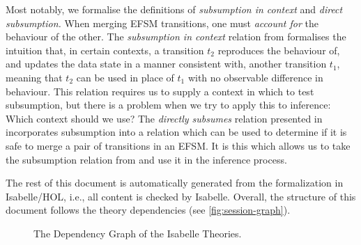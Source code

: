 \documentclass[10pt,DIV16,a4paper,abstract=true,twoside=semi,openright]{scrreprt}
\begin{document}
Most notably, we formalise the definitions of \emph{subsumption in context} and \emph{direct subsumption.} When merging EFSM transitions, one must \emph{account for} the behaviour of the other. The \emph{subsumption in context} relation from \cite{foster2018} formalises the intuition that, in certain contexts, a transition $t_2$ reproduces the behaviour of, and updates the data state in a manner consistent with, another transition $t_1$, meaning that $t_2$ can be used in place of $t_1$ with no observable difference in behaviour. This relation requires us to supply a context in which to test subsumption, but there is a problem when we try to apply this to inference: Which context should we use? The \emph{directly subsumes} relation presented in \cite{foster2019} incorporates subsumption into a relation which can be used to determine if it is safe to merge a pair of transitions in an EFSM. It is this which allows us to take the subsumption relation from \cite{foster2018} and use it in the inference process.

The rest of this document is automatically generated from the formalization in Isabelle/HOL, i.e., all content is checked by Isabelle.  Overall, the structure of this document follows the theory dependencies (see \autoref{fig:session-graph}).

\begin{sidewaysfigure}
  \centering
  \caption{The Dependency Graph of the Isabelle Theories.\label{fig:session-graph}}
\end{sidewaysfigure}

\nocite{foster.ea:efsm:2018}

\clearpage




{\small
  
  
}
\end{document}

